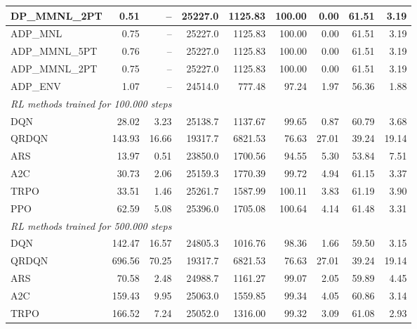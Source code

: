 \begin{samepage}
\begin{center}
\begin{tabular}{l|rr|rr|rr|rr}
    DP\_MMNL\_2PT &     0.51 &    -- &    25227.0 &    1125.83 &  100.00 &    0.00 &   61.51 &    3.19 \\
    \midrule
    ADP\_MNL     &     0.75 &    -- &    25227.0 &    1125.83 &  100.00 &    0.00 &   61.51 &    3.19 \\
    ADP\_MMNL\_5PT &     0.76 &    -- &    25227.0 &    1125.83 &  100.00 &    0.00 &   61.51 &    3.19 \\
    ADP\_MMNL\_2PT &     0.75 &    -- &    25227.0 &    1125.83 &  100.00 &    0.00 &   61.51 &    3.19 \\
    ADP\_ENV     &     1.07 &    -- &    24514.0 &     777.48 &   97.24 &    1.97 &   56.36 &    1.88 \\
    \midrule
    \multicolumn{9}{l}{\textit{RL methods trained for 100.000 steps}} \\
    \midrule
    DQN          &    28.02 &     3.23 &    25138.7 &    1137.67 &   99.65 &    0.87 &   60.79 &    3.68 \\
    QRDQN        &   143.93 &    16.66 &    19317.7 &    6821.53 &   76.63 &   27.01 &   39.24 &   19.14 \\
    ARS          &    13.97 &     0.51 &    23850.0 &    1700.56 &   94.55 &    5.30 &   53.84 &    7.51 \\
    A2C          &    30.73 &     2.06 &    25159.3 &    1770.39 &   99.72 &    4.94 &   61.15 &    3.37 \\
    TRPO         &    33.51 &     1.46 &    25261.7 &    1587.99 &  100.11 &    3.83 &   61.19 &    3.90 \\
    PPO          &    62.59 &     5.08 &    25396.0 &    1705.08 &  100.64 &    4.14 &   61.48 &    3.31 \\
    \midrule
    \multicolumn{9}{l}{\textit{RL methods trained for 500.000 steps}} \\
    \midrule
    DQN          &   142.47 &    16.57 &    24805.3 &    1016.76 &   98.36 &    1.66 &   59.50 &    3.15 \\
    QRDQN        &   696.56 &    70.25 &    19317.7 &    6821.53 &   76.63 &   27.01 &   39.24 &   19.14 \\
    ARS          &    70.58 &     2.48 &    24988.7 &    1161.27 &   99.07 &    2.05 &   59.89 &    4.45 \\
    A2C          &   159.43 &     9.95 &    25063.0 &    1559.85 &   99.34 &    4.05 &   60.86 &    3.14 \\
    TRPO         &   166.52 &     7.24 &    25052.0 &    1316.00 &   99.32 &    3.09 &   61.08 &    2.93 \\

\end{tabular}
\end{center}
\end{samepage}
